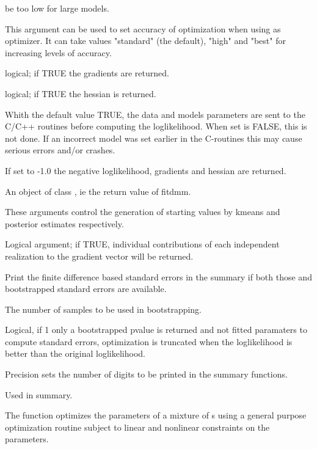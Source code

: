 \documentclass[a4paper]{book}
\begin{document}
\begin{Arguments}
\begin{ldescription}
be too low for large models.
\item[\code{accuracy}] This argument can be used to set accuracy of optimization 
when using  as optimizer. It can take values "standard" (the 
default), "high" and "best" for increasing levels of accuracy.
\item[\code{grad}] logical; if TRUE the gradients are returned.
\item[\code{hess}] logical; if TRUE the hessian is returned.
\item[\code{set}] Whith the default value TRUE, the data and models parameters
are sent to the C/C++ routines before computing the loglikelihood. When set
is FALSE, this is not done. If an incorrect model was set earlier in the 
C-routines this may cause serious errors and/or crashes.
\item[\code{sca}] If set to -1.0 the negative loglikelihood, gradients and hessian 
are returned.
\item[\code{object}] An object of class , ie the return value of 
fitdmm.
\item[\code{kmst,postst}] These arguments control the generation of starting
values by kmeans and posterior estimates respectively.
\item[\code{grInd}] Logical argument; if TRUE, individual contributions of
each independent realization to the gradient vector will be returned.
\item[\code{fd}] Print the finite difference based standard errors in the summary
if both those and bootstrapped standard errors are available.
\item[\code{samples}] The number of samples to be used in bootstrapping.
\item[\code{pvalonly}] Logical, if 1 only a bootstrapped pvalue is returned and not 
fitted paramaters to compute standard errors, optimization is truncated
when the loglikelihood is better than the original loglikelihood.
\item[\code{precision}] Precision sets the number of digits to be printed in the
summary functions.
\item[\code{...}] Used in summary.
\end{ldescription}
\end{Arguments}
\begin{Details}\relax
The function  optimizes the parameters of a mixture of
s using a general purpose optimization routine subject to linear
and nonlinear constraints on the parameters.
\end{Details}
\end{document}
